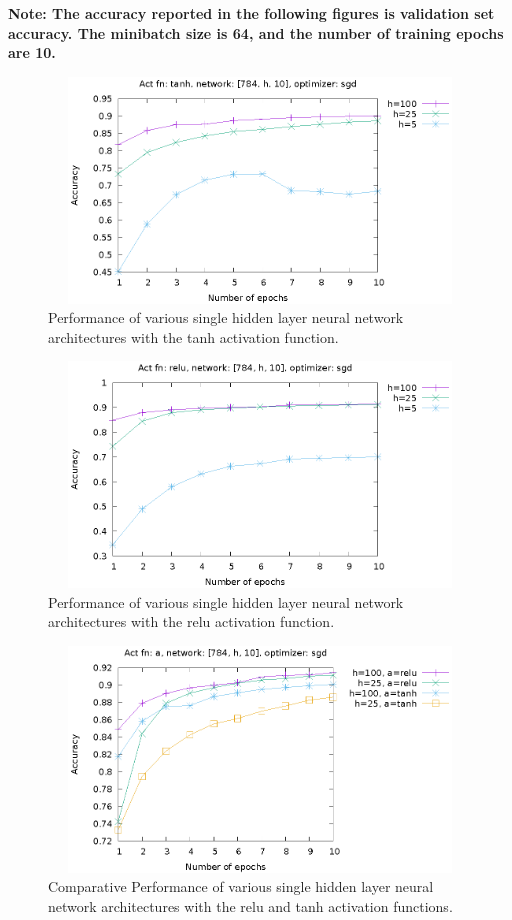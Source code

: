 \documentclass[12pt, a4paper]{article}
\begin{document}
\begin{itemize}
\textbf{Note: The accuracy reported in the following figures is validation set accuracy. The minibatch size is 64, and the number of training epochs are 10.}

\begin{figure}[h!]
\centering
\includegraphics[width=12cm, height=6cm]{tanh_single_hidden_layer.eps}
\caption{Performance of various single hidden layer neural network architectures with the tanh activation function. }
\end{figure}

\begin{figure}[h!]
\centering
\includegraphics[width=12cm, height=6cm]{relu_single_hidden_layer.eps}
\caption{Performance of various single hidden layer neural network architectures with the relu activation function. }
\end{figure}

\begin{figure}[h!]
\centering
\includegraphics[width=12cm, height=6cm]{relu_tanh_single_hidden_layer.eps}
\caption{Comparative Performance of various single hidden layer neural network architectures with the relu and tanh activation functions. }
\end{figure}


\end{itemize}
\end{document}
